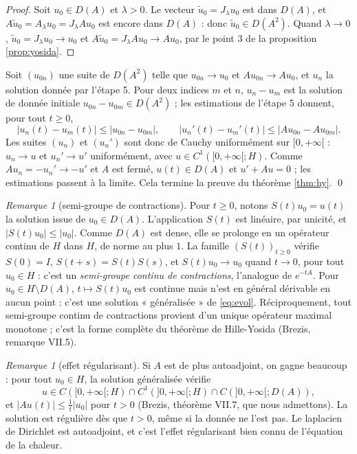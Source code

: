 \documentclass[11pt,a4paper]{article}
\theoremstyle{plain}
\theoremstyle{definition}
\theoremstyle{remark}
\newtheorem{remarque}[theoreme]{Remarque}
\begin{document}
\begin{proof}
Soit $u_0\in D(A)$ et $\lambda>0$. Le vecteur $\tilde u_0=J_\lambda u_0$ est dans $D(A)$, et $A\tilde u_0=A_\lambda u_0=J_\lambda Au_0$ est encore dans $D(A)$ : donc $\tilde u_0\in D(A^2)$. Quand $\lambda\to0$, $\tilde u_0=J_\lambda u_0\to u_0$ et $A\tilde u_0=J_\lambda Au_0\to Au_0$, par le point 3 de la proposition \ref{prop:yosida}.
\end{proof}

Soit $(u_{0n})$ une suite de $D(A^2)$ telle que $u_{0n}\to u_0$ et $Au_{0n}\to Au_0$, et $u_n$ la solution donnée par l'étape 5. Pour deux indices $m$ et $n$, $u_n-u_m$ est la solution de donnée initiale $u_{0n}-u_{0m}\in D(A^2)$ ; les estimations de l'étape 5 donnent, pour tout $t\geq0$,
\[
  |u_n(t)-u_m(t)|\leq|u_{0n}-u_{0m}|,\qquad|u_n'(t)-u_m'(t)|\leq|Au_{0n}-Au_{0m}| .
\]
Les suites $(u_n)$ et $(u_n')$ sont donc de Cauchy uniformément sur $[0,+\infty[$ : $u_n\to u$ et $u_n'\to u'$ uniformément, avec $u\in C^1([0,+\infty[;H)$. Comme $Au_n=-u_n'\to-u'$ et $A$ est fermé, $u(t)\in D(A)$ et $u'+Au=0$ ; les estimations passent à la limite. Cela termine la preuve du théorème \ref{thm:hy}. \qed

\begin{remarque}[semi-groupe de contractions]\label{rem:semigroupe}
Pour $t\geq0$, notons $S(t)u_0=u(t)$ la solution issue de $u_0\in D(A)$. L'application $S(t)$ est linéaire, par unicité, et $|S(t)u_0|\leq|u_0|$. Comme $D(A)$ est dense, elle se prolonge en un opérateur continu de $H$ dans $H$, de norme au plus $1$. La famille $(S(t))_{t\geq0}$ vérifie $S(0)=I$, $S(t+s)=S(t)S(s)$, et $S(t)u_0\to u_0$ quand $t\to0$, pour tout $u_0\in H$ : c'est un \emph{semi-groupe continu de contractions}, l'analogue de $e^{-tA}$. Pour $u_0\in H\setminus D(A)$, $t\mapsto S(t)u_0$ est continue mais n'est en général dérivable en aucun point : c'est une solution « généralisée » de \eqref{eq:evol}. Réciproquement, tout semi-groupe continu de contractions provient d'un unique opérateur maximal monotone ; c'est la forme complète du théorème de Hille-Yosida (Brezis, remarque VII.5).
\end{remarque}

\begin{remarque}[effet régularisant]\label{rem:regularisant}
Si $A$ est de plus autoadjoint, on gagne beaucoup : pour tout $u_0\in H$, la solution généralisée vérifie
\[
  u\in C([0,+\infty[;H)\cap C^1(]0,+\infty[;H)\cap C(]0,+\infty[;D(A)) ,
\]
et $|Au(t)|\leq\frac1t|u_0|$ pour $t>0$ (Brezis, théorème VII.7, que nous admettons). La solution est régulière dès que $t>0$, même si la donnée ne l'est pas. Le laplacien de Dirichlet est autoadjoint, et c'est l'effet régularisant bien connu de l'équation de la chaleur.
\end{remarque}
\end{document}
